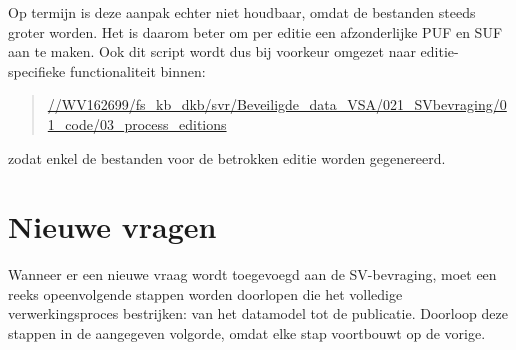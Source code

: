 \documentclass{VSAnote}
\begin{document}
Op termijn is deze aanpak echter niet houdbaar, omdat de bestanden steeds groter worden. Het is daarom beter om per editie een afzonderlijke PUF en SUF aan te maken. Ook dit script wordt dus bij voorkeur omgezet naar editie-specifieke functionaliteit binnen:
\begin{quote}
\url{//WV162699/fs_kb_dkb/svr/Beveiligde_data_VSA/021_SVbevraging/01_code/03_process_editions}
\end{quote}
zodat enkel de bestanden voor de betrokken editie worden gegenereerd.







\section{Nieuwe vragen}

Wanneer er een nieuwe vraag wordt toegevoegd aan de SV-bevraging, moet een reeks opeenvolgende stappen worden doorlopen die het volledige verwerkingsproces bestrijken: van het datamodel tot de publicatie. Doorloop deze stappen in de aangegeven volgorde, omdat elke stap voortbouwt op de vorige.
\end{document}
